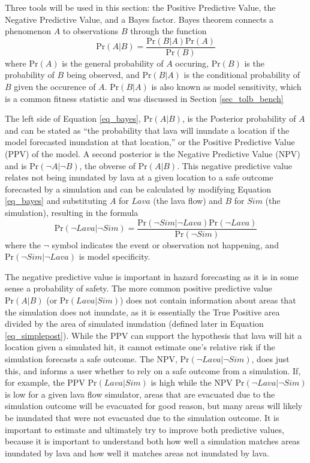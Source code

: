 	Three tools will be used in this section: the Positive Predictive Value, the Negative Predictive Value, and a Bayes factor. Bayes theorem connects a phenomenon $A$ to observations $B$ through the function
	\begin{equation}
		\text{Pr}(A|B)=\frac{\text{Pr}(B|A)\text{Pr}(A)}{\text{Pr}(B)}\label{eq_bayes}
	\end{equation}
	where $\text{Pr}(A)$ is the general probability of $A$ occuring, $\text{Pr}(B)$ is the probability of $B$ being observed, and $\text{Pr}(B|A)$ is the conditional probability of $B$ given the occurence of $A$. $\text{Pr}(B|A)$ is also known as model sensitivity, which is a common fitness statistic and was discussed in Section \ref{sec_tolb_bench}
	
	The left side of Equation \ref{eq_bayes}, $\text{Pr}(A|B)$, is the Posterior probability of $A$ and can be stated as ``the probability that lava will inundate a location if the model forecasted inundation at that location,'' or the Positive Predictive Value (PPV) of the model. A second posterior is the Negative Predictive Value (NPV) and is $\text{Pr}(\neg A|\neg B)$, the obverse of $\text{Pr}(A|B)$. This negative predictive value relates not being inundated by lava at a given location to a safe outcome forecasted by a simulation and can be calculated by modifying Equation \ref{eq_bayes} and substituting $A$ for $Lava$ (the lava flow) and $B$ for $Sim$ (the simulation), resulting in the formula
	\begin{equation}
		\text{Pr}(\neg Lava|\neg Sim)=\frac{\text{Pr}(\neg Sim|\neg Lava)\text{Pr}(\neg Lava)}{\text{Pr}(\neg Sim)}
	\end{equation}
	where the $\neg$ symbol indicates the event or observation not happening, and $\text{Pr}(\neg Sim|\neg Lava)$ is model specificity.
	
	The negative predictive value is important in hazard forecasting as it is in some sense a probability of safety. The more common positive predictive value $\text{Pr}(A|B)$ (or $\text{Pr}(Lava|Sim)$) does not contain information about areas that the simulation does not inundate, as it is essentially the True Positive area divided by the area of simulated inundation (defined later in Equation \ref{eq_simplepost}). While the PPV can support the hypothesis that lava will hit a location given a simulated hit, it cannot estimate one's relative risk if the simulation forecasts a safe outcome. The NPV, $\text{Pr}(\neg Lava|\neg Sim)$, does just this, and informs a user whether to rely on a safe outcome from a simulation. If, for example, the PPV $\text{Pr}(Lava|Sim)$ is high while the NPV $\text{Pr}(\neg Lava|\neg Sim)$ is low for a given lava flow simulator, areas that are evacuated due to the simulation outcome will be evacuated for good reason, but many areas will likely be inundated that were not evacuated due to the simulation outcome. It is important to estimate and ultimately try to improve both predictive values, because it is important to understand both how well a simulation matches areas inundated by lava and how well it matches areas not inundated by lava.
	
